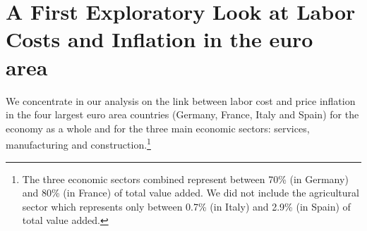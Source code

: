 \documentclass[11pt]{article}
\begin{document}


\section{A First Exploratory Look at Labor Costs and Inflation in the euro area}
\label{SectionDescriptive}
We concentrate in our analysis on the link between labor cost and price inflation in the four largest euro area countries (Germany, France, Italy and Spain) for the economy as a whole and for the three main economic sectors: services, manufacturing and construction.\footnote{The three economic sectors combined represent between 70\% (in Germany) and 80\% (in France) of total value added. We did not include the agricultural sector which represents only between 0.7\% (in Italy) and 2.9\% (in Spain) of total value added.}
\end{document}
